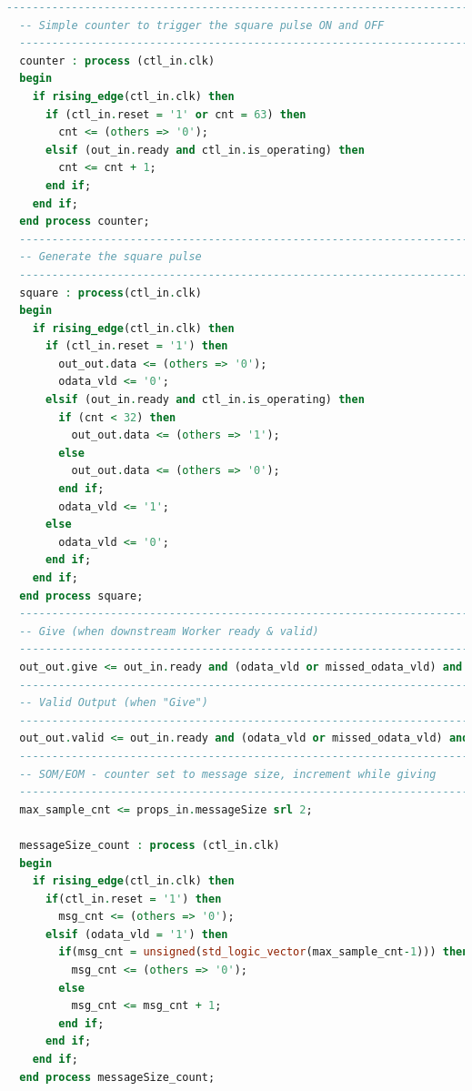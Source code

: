 \begin{lstlisting}[language=vhdl, columns=fullflexible, breaklines=true, prebreak=\textbackslash, basicstyle=\ttfamily, showstringspaces=false, upquote=true]
  -----------------------------------------------------------------------------
  -- Simple counter to trigger the square pulse ON and OFF
  -----------------------------------------------------------------------------
  counter : process (ctl_in.clk)
  begin
    if rising_edge(ctl_in.clk) then
      if (ctl_in.reset = '1' or cnt = 63) then
        cnt <= (others => '0');
      elsif (out_in.ready and ctl_in.is_operating) then
        cnt <= cnt + 1;
      end if;
    end if;
  end process counter;
  -----------------------------------------------------------------------------
  -- Generate the square pulse
  -----------------------------------------------------------------------------
  square : process(ctl_in.clk)
  begin
    if rising_edge(ctl_in.clk) then
      if (ctl_in.reset = '1') then
        out_out.data <= (others => '0');
        odata_vld <= '0';
      elsif (out_in.ready and ctl_in.is_operating) then
        if (cnt < 32) then
          out_out.data <= (others => '1');
        else
          out_out.data <= (others => '0');
        end if;
        odata_vld <= '1';
      else
        odata_vld <= '0';
      end if;
    end if;
  end process square;
  -----------------------------------------------------------------------------
  -- Give (when downstream Worker ready & valid)
  -----------------------------------------------------------------------------
  out_out.give <= out_in.ready and (odata_vld or missed_odata_vld) and ctl_in.is_operating;
  -----------------------------------------------------------------------------
  -- Valid Output (when "Give")
  -----------------------------------------------------------------------------
  out_out.valid <= out_in.ready and (odata_vld or missed_odata_vld) and ctl_in.is_operating;
  -----------------------------------------------------------------------------
  -- SOM/EOM - counter set to message size, increment while giving
  -----------------------------------------------------------------------------
  max_sample_cnt <= props_in.messageSize srl 2;

  messageSize_count : process (ctl_in.clk)
  begin
    if rising_edge(ctl_in.clk) then
      if(ctl_in.reset = '1') then
        msg_cnt <= (others => '0');
      elsif (odata_vld = '1') then
        if(msg_cnt = unsigned(std_logic_vector(max_sample_cnt-1))) then
          msg_cnt <= (others => '0');
        else
          msg_cnt <= msg_cnt + 1;
        end if;
      end if;
    end if;
  end process messageSize_count;


\end{lstlisting}
